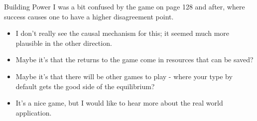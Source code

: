\documentclass[
  ignorenonframetext,
]{beamer}
\providecommand{\tightlist}{%
  \setlength{\itemsep}{0pt}\setlength{\parskip}{0pt}}
\begin{document}
\begin{frame}{Building Power}
\protect\hypertarget{building-power-1}{}
I was a bit confused by the game on page 128 and after, where success
causes one to have a higher disagreement point.

\begin{itemize}
\tightlist
\item
  I don't really see the causal mechanism for this; it seemed much more
  plausible in the other direction.
\item
  Maybe it's that the returns to the game come in resources that can be
  saved?
\item
  Maybe it's that there will be other games to play - where your type by
  default gets the good side of the equilibrium?
\item
  It's a nice game, but I would like to hear more about the real world
  application.
\end{itemize}
\end{frame}
\end{document}
